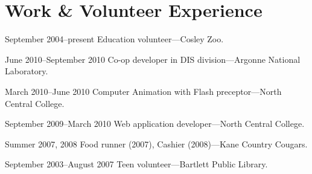 \documentclass{simplecv}
\begin{document}
  \section{Work \& Volunteer Experience}
  \begin{topic}
    \item[September 2004--present] Education volunteer---Cosley Zoo.
    \item[June 2010--September 2010] Co-op developer in DIS division---Argonne National Laboratory.
    \item[March 2010--June 2010] Computer Animation with Flash preceptor---North Central College.
    \item[September 2009--March 2010] Web application developer---North Central College.
    \item[Summer 2007, 2008] Food runner (2007), Cashier (2008)---Kane Country Cougars.
    \item[September 2003--August 2007] Teen volunteer---Bartlett Public Library.
  \end{topic}
\end{document}
